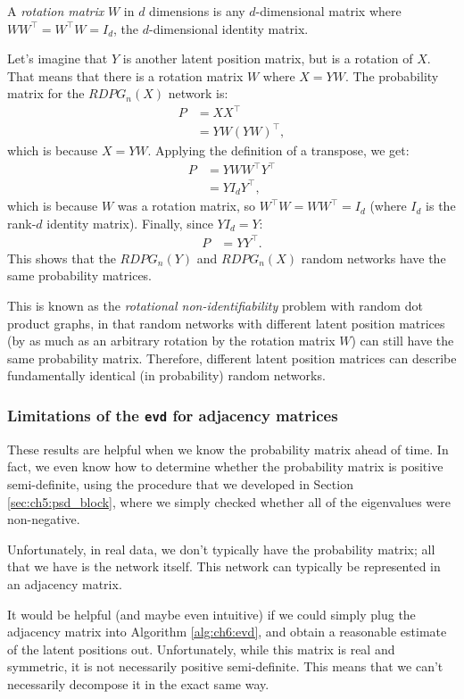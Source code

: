 A \textit{rotation matrix} $W$ in $d$ dimensions is any $d$-dimensional matrix where $WW^\top = W^\top W = I_d$, the $d$-dimensional identity matrix.

Let's imagine that $Y$ is another latent position matrix, but is a rotation of $X$. That means that there is a rotation matrix $W$ where $X = YW$. The probability matrix for the $RDPG_n(X)$ network is:
\begin{align*}
    P &= XX^\top \\
    &= YW\left(YW\right)^\top,
\end{align*}
which is because $X = YW$. Applying the definition of a transpose, we get:
\begin{align*}
    P &= YW W^\top Y^\top \\
    &= YI_d Y^\top,
\end{align*}
which is because $W$ was a rotation matrix, so $W^\top W = WW^\top = I_d$ (where $I_d$ is the rank-$d$ identity matrix). Finally, since $YI_d = Y$:
\begin{align*}
    P &= YY^\top.
\end{align*}
This shows that the $RDPG_n(Y)$ and $RDPG_n(X)$ random networks have the same probability matrices.

This is known as the \textit{rotational non-identifiability} problem with random dot product graphs, in that random networks with different latent position matrices (by as much as an arbitrary rotation by the rotation matrix $W$) can still have the same probability matrix. Therefore, different latent position matrices can describe fundamentally identical (in probability) random networks.

\subsubsection*{Limitations of the \texttt{evd} for adjacency matrices}

These results are helpful when we know the probability matrix ahead of time. In fact, we even know how to determine whether the probability matrix is positive semi-definite, using the procedure that we developed in Section \ref{sec:ch5:psd_block}, where we simply checked whether all of the eigenvalues were non-negative.


Unfortunately, in real data, we don't typically have the probability matrix; all that we have is the network itself. This network can typically be represented in an adjacency matrix. 

It would be helpful (and maybe even intuitive) if we could simply plug the adjacency matrix into Algorithm \ref{alg:ch6:evd}, and obtain a reasonable estimate of the latent positions out. Unfortunately, while this matrix is real and symmetric, it is not necessarily positive semi-definite. This means that we can't necessarily decompose it in the exact same way.

